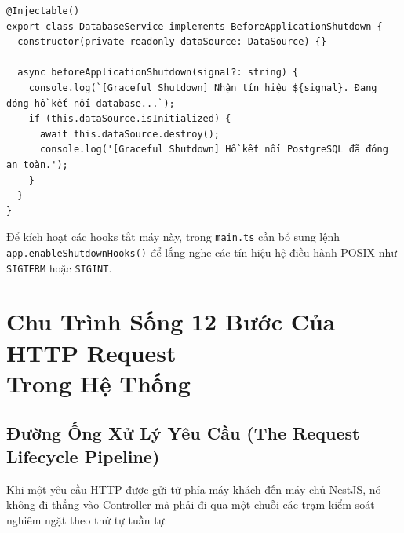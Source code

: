 \documentclass[12pt,a4paper,oneside]{book}
\begin{document}
\begin{codebox}
\begin{Verbatim}[fontsize=\small]
@Injectable()
export class DatabaseService implements BeforeApplicationShutdown {
  constructor(private readonly dataSource: DataSource) {}

  async beforeApplicationShutdown(signal?: string) {
    console.log(`[Graceful Shutdown] Nhận tín hiệu ${signal}. Đang đóng hồ kết nối database...`);
    if (this.dataSource.isInitialized) {
      await this.dataSource.destroy();
      console.log('[Graceful Shutdown] Hồ kết nối PostgreSQL đã đóng an toàn.');
    }
  }
}
\end{Verbatim}
\end{codebox}
Để kích hoạt các hooks tắt máy này, trong \texttt{main.ts} cần bổ sung lệnh \texttt{app.enableShutdownHooks()} để lắng nghe các tín hiệu hệ điều hành POSIX như \texttt{SIGTERM} hoặc \texttt{SIGINT}.

\chapter[Chu Trình Sống 12 Bước Của HTTP Request]{Chu Trình Sống 12 Bước Của HTTP Request\\Trong Hệ Thống}

\section{Đường Ống Xử Lý Yêu Cầu (The Request Lifecycle Pipeline)}
Khi một yêu cầu HTTP được gửi từ phía máy khách đến máy chủ NestJS, nó không đi thẳng vào Controller mà phải đi qua một chuỗi các trạm kiểm soát nghiêm ngặt theo thứ tự tuần tự:
\end{document}
